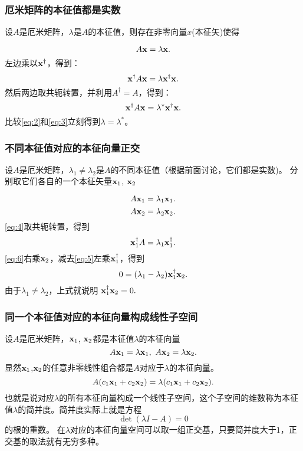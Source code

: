 \documentclass[CJK,13pt]{beamer}
\begin{document}

\begin{frame}
  \frametitle{厄米矩阵的本征值都是实数}
  设$A$是厄米矩阵，$\lambda$是$A$的本征值，则存在非零向量$x$(本征矢)使得

  \begin{equation}
    A {\mathbf{x}} = \lambda {\mathbf{x}}. \label{eq:1}
  \end{equation}
  左边乘以${\mathbf{x}}^\dagger$，得到：
  \begin{equation}
      {\mathbf{x}}^\dagger A {\mathbf{x}}  = \lambda {\mathbf{x}}^\dagger {\mathbf{x}}. \label{eq:2}
  \end{equation}
  然后两边取共轭转置，并利用$A^\dagger = A$，得到：
  \begin{equation}
      {\mathbf{x}}^\dagger A {\mathbf{x}}  = \lambda^* {\mathbf{x}}^\dagger {\mathbf{x}}. \label{eq:3}
  \end{equation}
  比较\eqref{eq:2}和\eqref{eq:3}立刻得到$\lambda = \lambda^*$。  
\end{frame}


\begin{frame}
  \frametitle{不同本征值对应的本征向量正交}
  设$A$是厄米矩阵，$\lambda_1 \ne \lambda_2$是$A$的不同本征值（根据前面讨论，它们都是实数)。 分别取它们各自的一个本征矢量${\mathbf{x}}_1$, ${\mathbf{x}}_2$

    \begin{equation}
      A{\mathbf{x}}_1 = \lambda_1 {\mathbf{x}}_1. \label{eq:4}
    \end{equation}
    \begin{equation}
      A{\mathbf{x}}_2 = \lambda_2 {\mathbf{x}}_2. \label{eq:5}
    \end{equation}
    \eqref{eq:4}取共轭转置，得到
    \begin{equation}
      {\mathbf{x}}_1^\dagger A = \lambda_1 {\mathbf{x}}_1^\dagger. \label{eq:6}
    \end{equation}
    \eqref{eq:6}右乘${\mathbf{x}}_2$，减去\eqref{eq:5}左乘${\mathbf{x}}_1^\dagger$，得到
    $$ 0 = (\lambda_1-\lambda_2){\mathbf{x}}_1^\dagger {\mathbf{x}}_2 . $$
    由于$\lambda_1\ne \lambda_2$，上式就说明  ${\mathbf{x}}_1^\dagger {\mathbf{x}}_2 = 0.$
\end{frame}

\begin{frame}
  \frametitle{同一个本征值对应的本征向量构成线性子空间}
  设$A$是厄米矩阵，${\mathbf{x}}_1$, ${\mathbf{x}}_2$都是本征值$\lambda$的本征向量
  $$A{\mathbf{x}}_1 =\lambda {\mathbf{x}}_1,\  A{\mathbf{x}}_2 = \lambda {\mathbf{x}}_2 .$$
  显然${\mathbf{x}}_1$,${\mathbf{x}}_2$的任意非零线性组合都是$A$对应于$\lambda$的本征向量。
  $$A(c_1{\mathbf{x}}_1 +c_2{\mathbf{x}}_2) = \lambda(c_1{\mathbf{x}}_1+c_2{\mathbf{x}}_2).$$
  也就是说对应$\lambda$的所有本征向量构成一个线性子空间，这个子空间的维数称为本征值$\lambda$的简并度。简并度实际上就是方程
  $$ \det\left( \lambda I - A\right) = 0 $$
  的根的重数。  
  在$\lambda$对应的本征向量空间可以取一组正交基，只要简并度大于$1$，正交基的取法就有无穷多种。
\end{frame}
\end{document}
